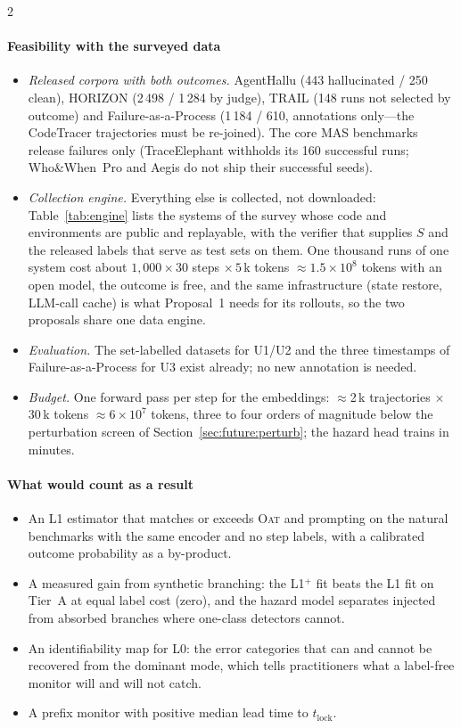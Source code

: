 \begin{multicols}{2}
\paragraph{Feasibility with the surveyed data}
\begin{itemize}[leftmargin=1.1em]
\item \emph{Released corpora with both outcomes.} AgentHallu (443 hallucinated / 250 clean), HORIZON (2\,498 / 1\,284 by judge), TRAIL (148 runs not selected by outcome) and Failure-as-a-Process (1\,184 / 610, annotations only---the CodeTracer trajectories must be re-joined). The core MAS benchmarks release failures only (TraceElephant withholds its 160 successful runs; Who\&When~Pro and Aegis do not ship their successful seeds).
\item \emph{Collection engine.} Everything else is collected, not downloaded: Table~\ref{tab:engine} lists the systems of the survey whose code and environments are public and replayable, with the verifier that supplies $S$ and the released labels that serve as test sets on them. One thousand runs of one system cost about $1{,}000\times30$ steps $\times\,5$\,k tokens $\approx1.5\times10^{8}$ tokens with an open model, the outcome is free, and the same infrastructure (state restore, LLM-call cache) is what Proposal~1 needs for its rollouts, so the two proposals share one data engine.
\item \emph{Evaluation.} The set-labelled datasets for U1/U2 and the three timestamps of Failure-as-a-Process for U3 exist already; no new annotation is needed.
\item \emph{Budget.} One forward pass per step for the embeddings: $\approx$2\,k trajectories $\times$ 30\,k tokens $\approx6\times10^{7}$ tokens, three to four orders of magnitude below the perturbation screen of Section~\ref{sec:future:perturb}; the hazard head trains in minutes.
\end{itemize}

\paragraph{What would count as a result}
\begin{itemize}[leftmargin=1.1em]
\item An L1 estimator that matches or exceeds \textsc{Oat} and prompting on the natural benchmarks with the same encoder and no step labels, with a calibrated outcome probability as a by-product.
\item A measured gain from synthetic branching: the L1$^{+}$ fit beats the L1 fit on Tier~A at equal label cost (zero), and the hazard model separates injected from absorbed branches where one-class detectors cannot.
\item An identifiability map for L0: the error categories that can and cannot be recovered from the dominant mode, which tells practitioners what a label-free monitor will and will not catch.
\item A prefix monitor with positive median lead time to $t_{\mathrm{lock}}$.
\end{itemize}
\end{multicols}

